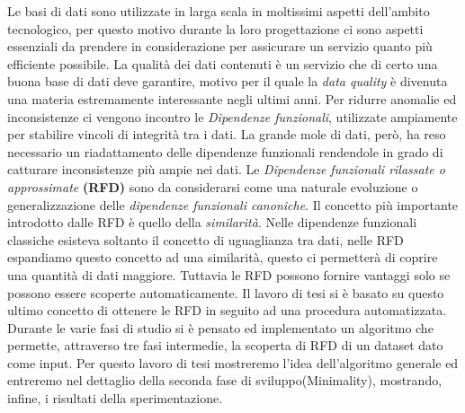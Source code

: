 Le basi di dati sono utilizzate in larga scala in moltissimi aspetti dell'ambito tecnologico, per questo motivo durante la loro progettazione ci sono aspetti essenziali da prendere in considerazione per assicurare un servizio quanto più efficiente possibile.
La qualità dei dati contenuti è un servizio che di certo una buona base di dati deve garantire, motivo per il quale la \emph{data quality} è divenuta una materia estremamente interessante negli ultimi anni. 
Per ridurre anomalie ed inconsistenze ci vengono incontro le \emph{Dipendenze funzionali}, utilizzate ampiamente per stabilire vincoli di integrità tra i dati.
La grande mole di dati, però, ha reso necessario un riadattamento delle dipendenze funzionali rendendole in grado di catturare inconsistenze più ampie nei dati. 
Le \emph{Dipendenze funzionali rilassate o approssimate} \textbf{(RFD)} sono da considerarsi come una naturale evoluzione o generalizzazione delle \emph{dipendenze funzionali canoniche}.
Il concetto più importante introdotto dalle RFD è quello della \emph{similarità}.
Nelle dipendenze funzionali classiche esisteva soltanto il concetto di uguaglianza tra dati, nelle RFD espandiamo questo concetto ad una similarità, questo ci permetterà di coprire una quantità di dati maggiore.
Tuttavia le RFD possono fornire vantaggi solo se possono essere scoperte automaticamente.
Il lavoro di tesi si è basato su questo ultimo concetto di ottenere le RFD in seguito ad una procedura automatizzata.
Durante le varie fasi di studio si è pensato ed implementato un algoritmo che permette, attraverso tre fasi intermedie, la scoperta di RFD di un dataset dato come input.
Per questo lavoro di tesi mostreremo l'idea dell'algoritmo generale ed entreremo nel dettaglio della seconda fase di sviluppo(Minimality), mostrando, infine, i risultati della sperimentazione.
